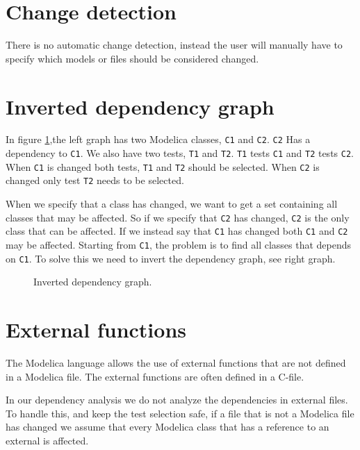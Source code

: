 \documentclass{cslthse-msc}
\begin{document}
\section{Change detection}
There is no automatic change detection, instead the user will manually have to specify which models or files should be considered changed.


\section{Inverted dependency graph}
In figure \ref{fig:invertedGraph},the left graph has two Modelica classes, \texttt{C1} and \texttt{C2}. \texttt{C2} Has a dependency to \texttt{C1}. We also have two tests, \texttt{T1} and \texttt{T2}. \texttt{T1} tests \texttt{C1} and \texttt{T2} tests \texttt{C2}. When \texttt{C1} is changed both tests, \texttt{T1} and \texttt{T2} should be selected. When \texttt{C2} is changed only test \texttt{T2} needs to be selected.

When we specify that a class has changed, we want to get a set containing all classes that may be affected. So if we specify that \texttt{C2} has changed, \texttt{C2} is the only class that can be affected. If we instead say that \texttt{C1} has changed both \texttt{C1} and \texttt{C2} may be affected. Starting from \texttt{C1}, the problem is to find all classes that depends on \texttt{C1}. To solve this we need to invert the dependency graph, see right graph.
\begin{figure}[!htbp]
    \centering
    \qquad
    \caption{Inverted dependency graph.}
    \label{fig:invertedGraph}
\end{figure}

\section{External functions}
The Modelica language allows the use of external functions that are not defined in a Modelica file. The external functions are often defined in a C-file.\cite{modelicamodelica}

In our dependency analysis we do not analyze the dependencies in external files. To handle this, and keep the test selection safe, if a file that is not a Modelica file has changed we assume that every Modelica class that has a reference to an external is affected.
\end{document}

